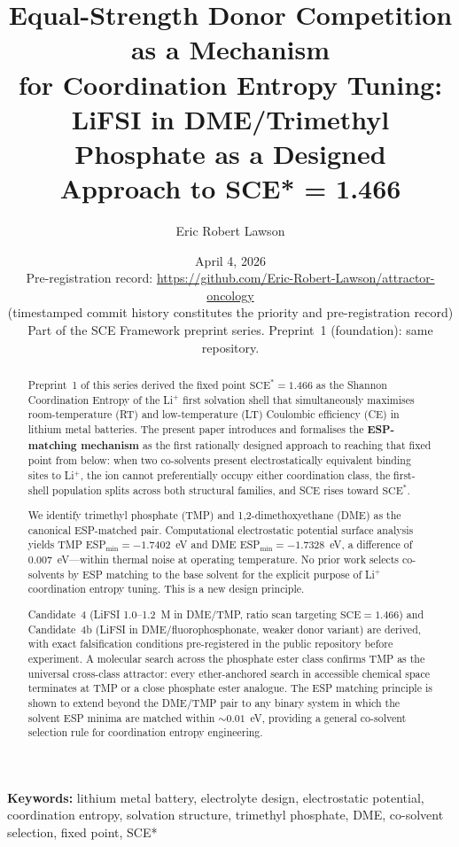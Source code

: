 \documentclass[11pt]{article}
\title{\textbf{Equal-Strength Donor Competition as a Mechanism\\
for Coordination Entropy Tuning:\\
LiFSI in DME/Trimethyl Phosphate as a Designed\\
Approach to SCE* = 1.466}}
\author[1]{Eric Robert Lawson}
\affil[1]{Independent Researcher, OrganismCore Initiative\\
\texttt{ORCID: 0009-0002-0414-6544}\\
Repository: \url{https://github.com/Eric-Robert-Lawson/attractor-oncology}}
\date{April 4, 2026\\
\small Pre-registration record:
\url{https://github.com/Eric-Robert-Lawson/attractor-oncology}\\
\small (timestamped commit history constitutes the priority
and pre-registration record)\\
\small Part of the SCE Framework preprint series.
Preprint~1 (foundation): same repository.}
\theoremstyle{plain}
\theoremstyle{definition}
\theoremstyle{remark}
\begin{document}
\maketitle

\begin{abstract}
Preprint~1 of this series derived the fixed point
$\mathrm{SCE}^{*} = 1.466$ as the Shannon Coordination Entropy of the
Li$^+$ first solvation shell that simultaneously maximises room-temperature
(RT) and low-temperature (LT) Coulombic efficiency (CE) in lithium metal
batteries.  The present paper introduces and formalises the
\textbf{ESP-matching mechanism} as the first rationally designed approach
to reaching that fixed point from below: when two co-solvents present
electrostatically equivalent binding sites to Li$^+$, the ion cannot
preferentially occupy either coordination class, the first-shell population
splits across both structural families, and SCE rises toward
$\mathrm{SCE}^{*}$.

We identify trimethyl phosphate (TMP) and 1,2-dimethoxyethane (DME) as the
canonical ESP-matched pair.  Computational electrostatic potential surface
analysis yields TMP ESP$_{\min} = -1.7402$~eV and DME ESP$_{\min} =
-1.7328$~eV, a difference of $0.007$~eV---within thermal noise at
operating temperature.  No prior work selects co-solvents by ESP matching
to the base solvent for the explicit purpose of Li$^+$ coordination entropy
tuning.  This is a new design principle.

Candidate~4 (LiFSI 1.0--1.2~M in DME/TMP, ratio scan targeting
$\mathrm{SCE} = 1.466$) and Candidate~4b (LiFSI in DME/fluorophosphonate,
weaker donor variant) are derived, with exact falsification conditions
pre-registered in the public repository before experiment.  A molecular
search across the phosphate ester class confirms TMP as the universal
cross-class attractor: every ether-anchored search in accessible chemical
space terminates at TMP or a close phosphate ester analogue.  The ESP
matching principle is shown to extend beyond the DME/TMP pair to any
binary system in which the solvent ESP minima are matched within
$\sim\!0.01$~eV, providing a general co-solvent selection rule for
coordination entropy engineering.
\end{abstract}

\vspace{1em}
\noindent\textbf{Keywords:} lithium metal battery, electrolyte design,
electrostatic potential, coordination entropy, solvation structure,
trimethyl phosphate, DME, co-solvent selection, fixed point, SCE*
\end{document}
